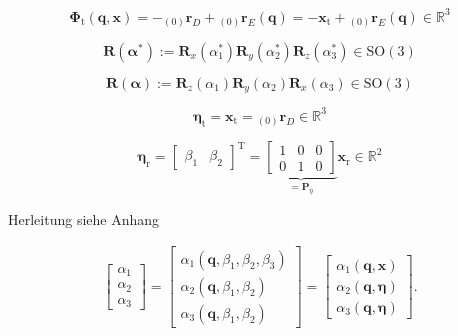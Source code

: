 \documentclass[robotics,article,submit,moreauthors,pdftex]{Definitions/mdpi}
\newcommand{\bm}[1]{\boldsymbol{#1}}
\newcommand{\ortvek}[4]{{ }_{(#1)}{\boldsymbol{#2}}^{#3}_{#4} }
\newcommand{\transp}[0]{{\mathrm{T}}}
\begin{document}
\begin{equation}
\bm{\Phi}_{\mathrm{t}}(\bm{q},\bm{x})
=
- \ortvek{0}{r}{}{D} + \ortvek{0}{r}{}{E}(\bm{q})
=
- \bm{x}_{\mathrm{t}} + \ortvek{0}{r}{}{E}(\bm{q})
\in {\mathbb{R}}^{3}
\label{equ:Phit_def}
\end{equation}

\begin{equation}
\bm{R}(\bm{\alpha}^*) := \bm{R}_x(\alpha_1^*) \bm{R}_y(\alpha_2^*) \bm{R}_z(\alpha_3^*) \in \mathrm{SO(3)}
\label{equ:alpha_convention_xyz}
\end{equation}

\begin{equation}
\bm{R}(\bm{\alpha}) := \bm{R}_z(\alpha_1) \bm{R}_y(\alpha_2) \bm{R}_x(\alpha_3) \in \mathrm{SO(3)}
\label{equ:def_rmat_zyxr}
\end{equation}


\begin{equation}
\bm{\eta}_{\mathrm{t}}
=
\bm{x}_{\mathrm{t}}
=
\ortvek{0}{r}{}{D}
\in {\mathbb{R}}^{3}
\end{equation}  


\begin{equation}
\bm{\eta}_{\mathrm{r}}
=
\begin{bmatrix}
\beta_1  & \beta_2
\end{bmatrix}^\transp
=
\underbrace{\begin{bmatrix}
    1 & 0 & 0  \\ 
    0 & 1 & 0
    \end{bmatrix}}_{=\bm{P}_{\eta}}
\bm{x}_{\mathrm{r}}
\in {\mathbb{R}}^{2}
\label{equ:etar_def}
\end{equation}

Herleitung siehe Anhang

\begin{align}
\begin{bmatrix}
\alpha_1 \\
\alpha_2 \\
\alpha_3
\end{bmatrix}
=
\begin{bmatrix}
\alpha_1(\bm{q},\beta_1,\beta_2,\beta_3) \\
\alpha_2(\bm{q},\beta_1,\beta_2) \\
\alpha_3(\bm{q},\beta_1,\beta_2)
\end{bmatrix}
=
\begin{bmatrix}
\alpha_1(\bm{q},\bm{x}) \\
\alpha_2(\bm{q},\bm{\eta}) \\
\alpha_3(\bm{q},\bm{\eta}) 
\end{bmatrix}
\label{equ:alpha_dep_beta}.
\end{align}
\end{document}
